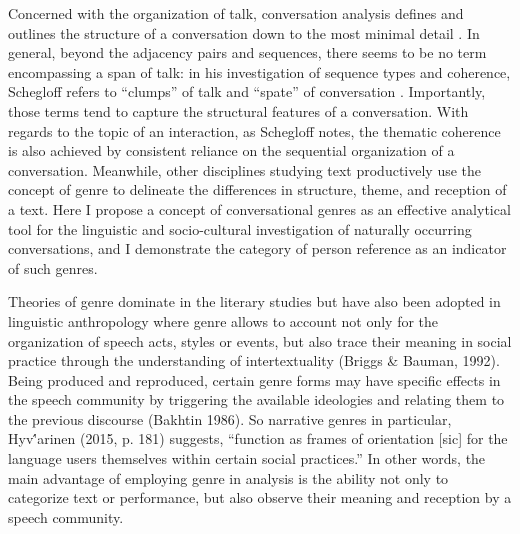 \documentclass[12pt]{turabian-researchpaper}
\begin{document}
 Concerned with the organization of talk, conversation analysis defines and outlines the structure of a conversation down to the most minimal detail \autocite{SSJ1974}. In general, beyond the adjacency pairs and sequences, there seems to be no term encompassing a span of talk: in his investigation of sequence types and coherence, Schegloff refers to ``clumps'' of talk and ``spate'' of conversation \autocite{Schegloff1990}. Importantly, those terms tend to capture the structural features of a conversation. With regards to the topic of an interaction, as Schegloff notes, the thematic coherence is also achieved by consistent reliance on the sequential organization of a conversation. Meanwhile, other disciplines studying text productively use the concept of genre to delineate the differences in structure, theme, and reception of a text. Here I propose a concept of conversational genres as an effective analytical tool for the linguistic and socio-cultural investigation of naturally occurring conversations, and I demonstrate the category of person reference as an indicator of such genres.

Theories of genre dominate in the literary studies but have also been adopted in linguistic anthropology where genre allows to account not only for the organization of speech acts, styles or events, but also trace their meaning in social practice through the understanding of intertextuality (Briggs \& Bauman, 1992). Being produced and reproduced, certain genre forms may have specific effects in the speech community by triggering the available ideologies and relating them to the previous discourse (Bakhtin 1986). So narrative genres in particular, Hyv\''arinen (2015, p. 181) suggests, ``function as frames of orientation [sic] for the language users themselves within certain social practices.'' In other words, the main advantage of employing genre in analysis is the ability not only to categorize text or performance, but also observe their meaning and reception by a speech community. 
\end{document}

